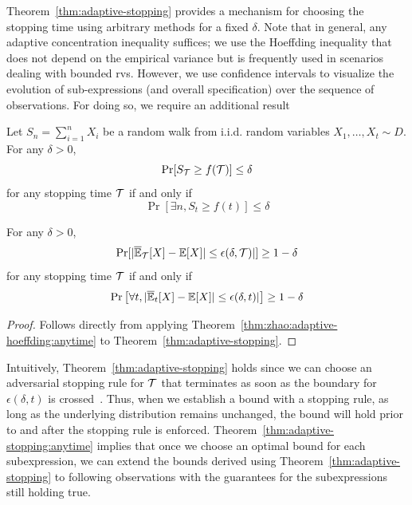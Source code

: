 Theorem~\ref{thm:adaptive-stopping} provides a mechanism for choosing the stopping time using arbitrary methods for a fixed $\delta$. 
Note that in general, any adaptive concentration inequality suffices; we use the Hoeffding inequality that does not depend on the empirical variance but is frequently used in scenarios dealing with bounded rvs.
However, we use confidence intervals to visualize the evolution of sub-expressions (and overall specification) over the sequence of observations. 
For doing so, we require an additional result

\begin{theorem}\cite[Proposition 1, Lemma 1]{zhao2016adaptive}
Let $S_n = \sum_{i=1}^n X_i$ be a random walk from i.i.d. random variables $X_1, \dots, X_t \sim D$. For any $\delta > 0$,
$$\Pr[S_{\mathcal{T}} \geq f({\mathcal{T}})] \leq \delta$$
for any stopping time ${\mathcal{T}}$ if and only if
$$\Pr\left[\exists n, S_t \geq f(t) \right] \leq \delta$$

\label{thm:zhao:adaptive-hoeffding:anytime}
\end{theorem}

\begin{corollary}
\label{thm:adaptive-stopping:anytime}
For any $\delta > 0$, 
\[
  \Pr[|\overline{\mathbb{E}}_{\mathcal{T}}[X] - \mathbb{E}[X]| \leq \epsilon(\delta, {\mathcal{T}})|] \geq 1 - \delta 
\]
for any stopping time ${\mathcal{T}}$ if and only if
\[
\Pr\left[\forall t, |\overline{\mathbb{E}}_t[X] - \mathbb{E}[X]| \leq \epsilon(\delta, t)| \right] \geq 1 - \delta
\]
\end{corollary}
\begin{proof}
Follows directly from applying Theorem~\ref{thm:zhao:adaptive-hoeffding:anytime} to Theorem~\ref{thm:adaptive-stopping}.
\end{proof}

Intuitively, Theorem~\ref{thm:adaptive-stopping} holds since we can choose an adversarial stopping rule for ${\mathcal{T}}$ that terminates as soon as the boundary for $\epsilon(\delta, t)$ is crossed~\citep{zhao2016adaptive}. 
Thus, when we establish a bound with a stopping rule, as long as the underlying distribution remains unchanged, the bound will hold prior to and after the stopping rule is enforced.
Theorem~\ref{thm:adaptive-stopping:anytime} implies that once we choose an optimal bound for each subexpression, we can extend the bounds derived using Theorem~\ref{thm:adaptive-stopping} to following observations with the guarantees for the subexpressions still holding true.



